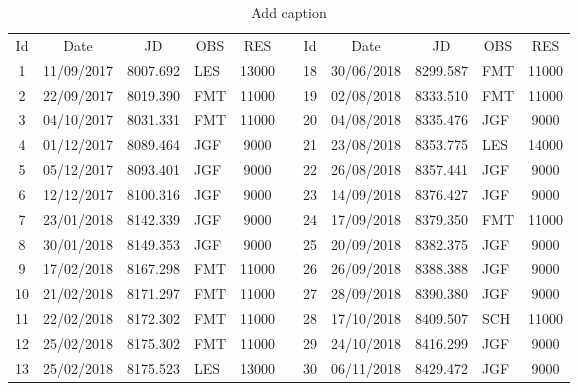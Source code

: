 \begin{table}[htbp]
  \centering
  \caption{Add caption}
    \begin{tabular}{|c|c|c|p{1.715em}|c|r|c|c|c|p{1.715em}|c|}
\cmidrule{1-5}\cmidrule{7-11}    Id    & Date  & JD    & \multicolumn{1}{c|}{OBS} & RES   &       & Id    & Date  & JD    & \multicolumn{1}{c|}{OBS} & RES \\
\cmidrule{1-5}\cmidrule{7-11}    1     & 11/09/2017 & 8007.692 & LES   & 13000 &       & 18    & 30/06/2018 & 8299.587 & FMT   & 11000 \\
\cmidrule{1-5}\cmidrule{7-11}    2     & 22/09/2017 & 8019.390 & FMT   & 11000 &       & 19    & 02/08/2018 & 8333.510 & FMT   & 11000 \\
\cmidrule{1-5}\cmidrule{7-11}    3     & 04/10/2017 & 8031.331 & FMT   & 11000 &       & 20    & 04/08/2018 & 8335.476 & JGF   & 9000 \\
\cmidrule{1-5}\cmidrule{7-11}    4     & 01/12/2017 & 8089.464 & JGF   & 9000  &       & 21    & 23/08/2018 & 8353.775 & LES   & 14000 \\
\cmidrule{1-5}\cmidrule{7-11}    5     & 05/12/2017 & 8093.401 & JGF   & 9000  &       & 22    & 26/08/2018 & 8357.441 & JGF   & 9000 \\
\cmidrule{1-5}\cmidrule{7-11}    6     & 12/12/2017 & 8100.316 & JGF   & 9000  &       & 23    & 14/09/2018 & 8376.427 & JGF   & 9000 \\
\cmidrule{1-5}\cmidrule{7-11}    7     & 23/01/2018 & 8142.339 & JGF   & 9000  &       & 24    & 17/09/2018 & 8379.350 & FMT   & 11000 \\
\cmidrule{1-5}\cmidrule{7-11}    8     & 30/01/2018 & 8149.353 & JGF   & 9000  &       & 25    & 20/09/2018 & 8382.375 & JGF   & 9000 \\
\cmidrule{1-5}\cmidrule{7-11}    9     & 17/02/2018 & 8167.298 & FMT   & 11000 &       & 26    & 26/09/2018 & 8388.388 & JGF   & 9000 \\
\cmidrule{1-5}\cmidrule{7-11}    10    & 21/02/2018 & 8171.297 & FMT   & 11000 &       & 27    & 28/09/2018 & 8390.380 & JGF   & 9000 \\
\cmidrule{1-5}\cmidrule{7-11}    11    & 22/02/2018 & 8172.302 & FMT   & 11000 &       & 28    & 17/10/2018 & 8409.507 & SCH   & 11000 \\
\cmidrule{1-5}\cmidrule{7-11}    12    & 25/02/2018 & 8175.302 & FMT   & 11000 &       & 29    & 24/10/2018 & 8416.299 & JGF   & 9000 \\
\cmidrule{1-5}\cmidrule{7-11}    13    & 25/02/2018 & 8175.523 & LES   & 13000 &       & 30    & 06/11/2018 & 8429.472 & JGF   & 9000 \\

\end{tabular}
\end{table}
